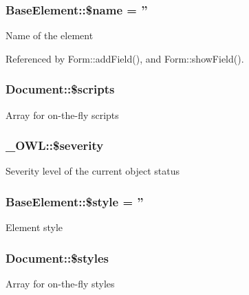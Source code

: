 \subsubsection[{\$name}]{\setlength{\rightskip}{0pt plus 5cm}BaseElement::\$name = ''}\label{classBaseElement_a30b8cff187a9de659a70daf287d66f45}
Name of the element 

Referenced by Form::addField(), and Form::showField().

\subsubsection[{\$scripts}]{\setlength{\rightskip}{0pt plus 5cm}Document::\$scripts}\label{classDocument_a011e1486a1c78776019df42ed652f6f0}
Array for on-\/the-\/fly scripts 
\subsubsection[{\$severity}]{\setlength{\rightskip}{0pt plus 5cm}\_\-OWL::\$severity}\label{class__OWL_ad26b40a9dbbacb33e299b17826f8327c}
Severity level of the current object status 
\subsubsection[{\$style}]{\setlength{\rightskip}{0pt plus 5cm}BaseElement::\$style = ''}\label{classBaseElement_a429a3d642dd95f30e1059ef29564b87d}
Element style 
\subsubsection[{\$styles}]{\setlength{\rightskip}{0pt plus 5cm}Document::\$styles}\label{classDocument_a5ef42574b069d405190dea3a7d977cb2}
Array for on-\/the-\/fly styles 
